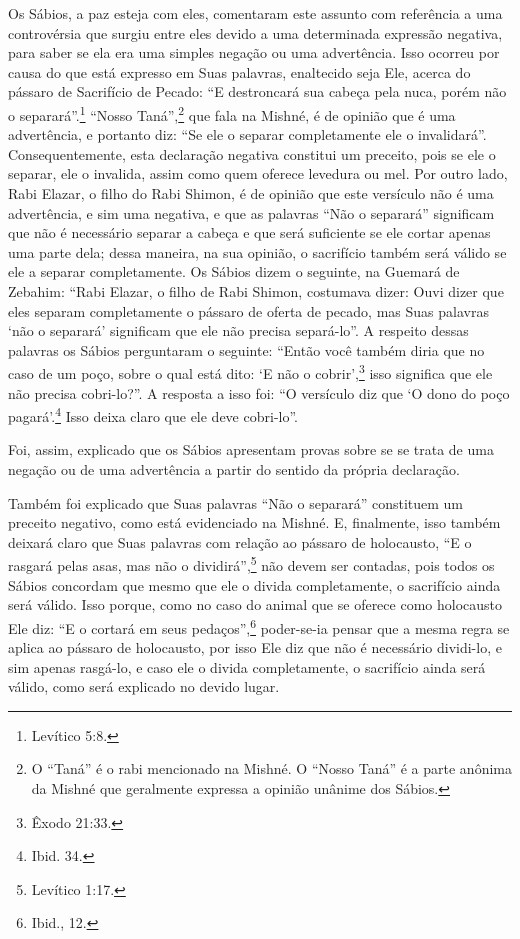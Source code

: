 Os Sábios, a paz esteja com eles, comentaram este assunto com
referência a uma controvérsia que surgiu entre eles devido a uma
determinada expressão negativa, para saber se ela era uma simples
negação ou uma advertência. Isso ocorreu por causa do que está expresso
em Suas palavras, enaltecido seja Ele, acerca do pássaro de Sacrifício
de Pecado: ``E destroncará sua cabeça pela nuca, porém não o separará''.\footnote{Levítico 5:8.} ``Nosso Taná'',\footnote{O ``Taná'' é o rabi mencionado na Mishné. O ``Nosso Taná'' é a
parte anônima da Mishné que geralmente expressa a opinião unânime dos
Sábios.} que fala na Mishné,
é de opinião que é uma advertência, e portanto diz: ``Se ele o separar
completamente ele o invalidará''. Consequentemente, esta declaração
negativa constitui um preceito, pois se ele o separar, ele o invalida,
assim como quem oferece levedura ou mel. Por outro lado, Rabi Elazar, o
filho do Rabi Shimon, é de opinião que este versículo não é uma
advertência, e sim uma negativa, e que as palavras ``Não o separará''
significam que não é necessário separar a cabeça e que será suficiente
se ele cortar apenas uma parte dela; dessa maneira, na sua opinião, o
sacrifício também será válido se ele a separar completamente. Os Sábios
dizem o seguinte, na Guemará de Zebahim: ``Rabi Elazar, o filho de Rabi
Shimon, costumava dizer: Ouvi dizer que eles separam completamente o
pássaro de oferta de pecado, mas Suas palavras `não o separará'
significam que ele não precisa separá-lo''. A respeito dessas palavras
os Sábios perguntaram o seguinte: ``Então você também diria que no caso
de um poço, sobre o qual está
dito: `E não o cobrir',\footnote{Êxodo 21:33.} isso significa que ele não precisa
cobri-lo?''. A resposta a isso foi: ``O versículo diz que `O dono do
poço pagará'.\footnote{Ibid. 34.} Isso deixa claro que ele deve cobri-lo''.

Foi, assim, explicado que os Sábios apresentam provas sobre se se trata
de uma negação ou de uma advertência a partir do sentido da própria
declaração.

Também foi explicado que Suas palavras ``Não o separará'' constituem um
preceito negativo, como está evidenciado na Mishné. E, finalmente, isso
também deixará claro que Suas palavras com relação ao pássaro de
holocausto, ``E o rasgará pelas asas, mas não o dividirá'',\footnote{Levítico
1:17.} não devem ser contadas, pois todos os Sábios concordam que mesmo
que ele o divida completamente, o sacrifício ainda será válido. Isso
porque, como no caso do animal que se oferece como holocausto Ele diz:
``E o cortará em seus pedaços'',\footnote{Ibid., 12.} poder-se-ia pensar que a
mesma regra se aplica ao pássaro de holocausto, por isso Ele diz que
não é necessário dividi-lo, e sim apenas rasgá-lo, e caso ele o divida
completamente, o sacrifício ainda será válido, como será explicado no
devido lugar.

